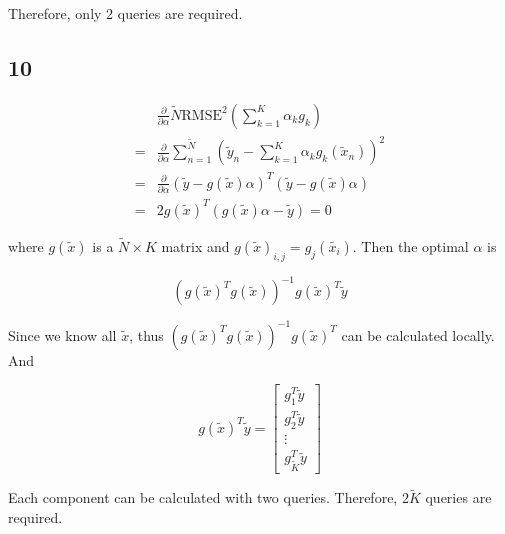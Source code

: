 \documentclass[fleqn,a4paper,12pt]{article}
\begin{document}
Therefore, only 2 queries are required.

\subsection*{10}

\begin{align*}
  &  \frac{\partial}{\partial \alpha} \tilde{N} \mathrm{RMSE}^2(\sum_{k=1}^K \alpha_k g_k) \\
  =& \frac{\partial}{\partial \alpha}  \sum_{n=1}^{\tilde{N}}(\tilde{y}_n - \sum_{k=1}^K \alpha_k g_k(\tilde{x}_n))^2 \\
  =& \frac{\partial}{\partial \alpha}  (\tilde{y} - g(\tilde{x}) \alpha)^T (\tilde{y} - g(\tilde{x}) \alpha) \\
  =& 2 g(\tilde{x})^T (g(\tilde{x})\alpha - \tilde{y}) = 0 
\end{align*}

where $g(\tilde{x})$ is a $\tilde{N} \times K$ matrix and $g(\tilde{x})_{i,j} = g_j(\tilde{x_i})$. Then the optimal $\alpha$ is

$$(g(\tilde{x})^T g(\tilde{x}))^{-1} g(\tilde{x})^T \tilde{y}$$

Since we know all $\tilde{x}$, thus $(g(\tilde{x})^T g(\tilde{x}))^{-1} g(\tilde{x})^T$ can be calculated locally. And 

$$
  g(\tilde{x})^T \tilde{y} = \begin{bmatrix} g_1^T \tilde{y} \\ g_2^T \tilde{y} \\ \vdots \\ g_{\tilde{K}}^T \tilde{y}  \end{bmatrix}
$$

Each component can be calculated with two queries. Therefore, $2\tilde{K}$ queries are required.
\end{document}
